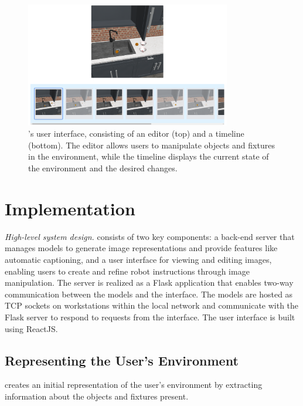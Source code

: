 \begin{figure}[htbp]
\centerline{\includegraphics[width=0.8\textwidth]{figures/Interface.png}}
\caption{\projname's user interface, consisting of an editor (top) and a timeline (bottom). The editor allows users to manipulate objects and fixtures in the environment, while the timeline displays the current state of the environment and the desired changes.}
\label{fig:interface}
\end{figure}

\section{Implementation}
\noindent \emph{High-level system design.} \projname consists of two key components: a back-end server that manages models to generate image representations and provide features like automatic captioning, and a user interface for viewing and editing images, enabling users to create and refine robot instructions through image manipulation. The server is realized as a Flask application that enables two-way communication between the models and the interface. The models are hosted as TCP sockets on workstations within the local network and communicate with the Flask server to respond to requests from the interface. The user interface is built using ReactJS. 


\subsection{Representing the User's Environment} 
\projname creates an initial representation of the user's environment by extracting information about the objects and fixtures present.


